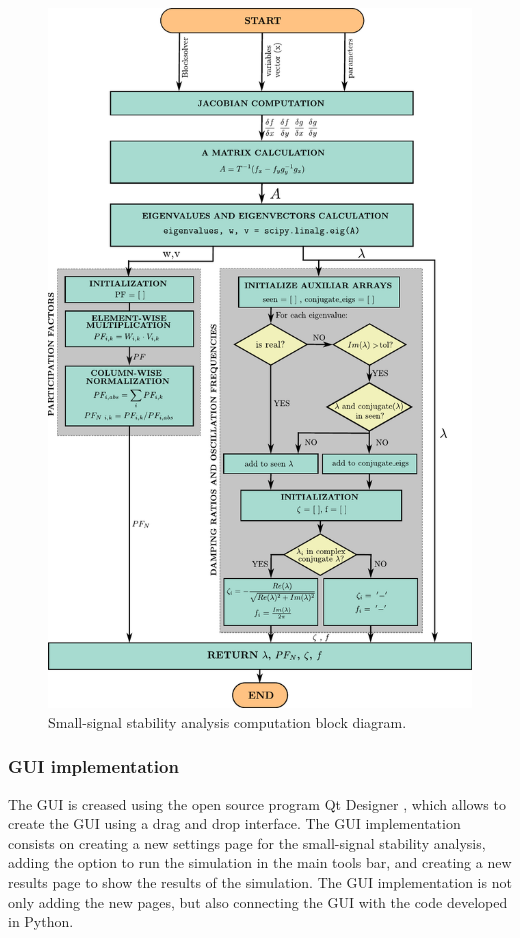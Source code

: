 \begin{figure}[H]
  \centering
  \includegraphics[width=0.8\linewidth]{inkscape_svg/block_diagram_run_smallsignal.pdf}
  \caption{Small-signal stability analysis computation block diagram.}
  \label{fig:block_diagram_run_smallsignal}
\end{figure}

\subsubsection{GUI implementation}

The GUI is creased using the open source program Qt Designer \cite{qt_designer}, which allows to create the GUI using a drag 
and drop interface. The GUI implementation consists on creating a new settings page for the small-signal stability analysis,
adding the option to run the simulation in the main tools bar, and creating a new results page to show the results of the simulation. 
The GUI implementation is not only adding the new pages, but also connecting the GUI with the code developed in Python.


